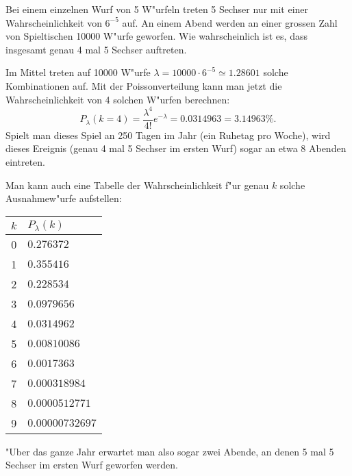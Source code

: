 Bei einem einzelnen Wurf von 5 W"urfeln treten 5 Sechser nur mit
einer Wahrscheinlichkeit von $6^{-5}$ auf. An einem Abend werden
an einer grossen Zahl von Spieltischen 10000 W"urfe geworfen.
Wie wahrscheinlich ist es, dass insgesamt genau 4 mal 5 Sechser
auftreten.

\begin{loesung}
Im Mittel treten auf 10000 W"urfe $\lambda=10000\cdot 6^{-5}\simeq 1.28601$
solche
Kombinationen auf. Mit der Poissonverteilung kann man jetzt die
Wahrscheinlichkeit von 4 solchen W"urfen berechnen:
\[
P_\lambda(k=4)=\frac{\lambda^4}{4!}e^{-\lambda}
=
0.0314963=3.14963\%.
\]
Spielt man dieses Spiel an 250 Tagen im Jahr (ein Ruhetag pro Woche),
wird dieses Ereignis (genau 4 mal 5 Sechser im ersten Wurf) sogar
an etwa 8 Abenden eintreten.

Man kann auch eine Tabelle
der Wahrscheinlichkeit f"ur genau $k$ solche Ausnahmew"urfe aufstellen:
\begin{center}
\begin{tabular}{|c|l|}
\hline
$k$&$P_\lambda(k)$\\
\hline
0&$0.276372$\\
1&$0.355416$\\
2&$0.228534$\\
3&$0.0979656$\\
4&$0.0314962$\\
5&$0.00810086$\\
6&$0.0017363$\\
7&$0.000318984$\\
8&$0.0000512771$\\
9&$0.00000732697$\\
\hline
\end{tabular}
\end{center}
"Uber das ganze Jahr erwartet man also sogar zwei Abende,
an denen 5 mal 5 Sechser im ersten Wurf geworfen werden.
\end{loesung}

